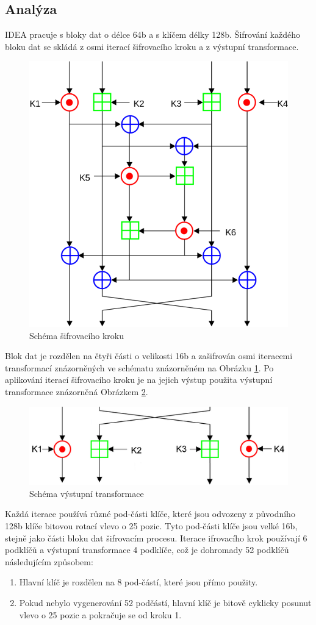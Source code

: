 \documentclass[12pt,a4paper]{article}
\begin{document}
\subsection{Analýza}
IDEA pracuje s bloky dat o délce 64b a s klíčem délky 128b. Šifrování každého bloku dat se skládá z osmi iterací šifrovacího kroku a z výstupní transformace.
\begin{figure}[h]
	\centering
	\includegraphics[width=0.4\linewidth]{img/fig_idea-step.png}
	\caption{Schéma šifrovacího kroku \cite{wiki.IDEA}}
	\label{fig:idea-step}
\end{figure}

Blok dat je rozdělen na čtyři části o velikosti 16b a zašifrován osmi iteracemi transformací znázorněných ve schématu znázorněném na Obrázku \ref{fig:idea-step}. Po aplikování iterací šifrovacího kroku je na jejich výstup použita výstupní transformace znázorněná Obrázkem \ref{fig:idea-half-step}.

\begin{figure}[h]
	\centering
	\includegraphics[width=0.4\linewidth]{img/fig_idea-half-step.png}
	\caption{Schéma výstupní transformace \cite{wiki.IDEA}}
	\label{fig:idea-half-step}
\end{figure}

Každá iterace používá různé pod-části klíče, které jsou odvozeny z původního 128b klíče bitovou rotací vlevo o 25 pozic. Tyto pod-části klíče jsou velké 16b, stejně jako části bloku dat šifrovacím procesu.
Iterace ifrovacího krok používají 6 podklíčů a výstupní transformace 4 podklíče, což je dohromady 52 podklíčů následujícím způsobem:
\begin{enumerate}
\item Hlavní klíč je rozdělen na 8 pod-částí, které jsou přímo použity.
\item Pokud nebylo vygenerování 52 podčástí, hlavní klíč je bitově cyklicky posunut vlevo o 25 pozic a pokračuje se od kroku 1.
\end{enumerate}
\end{document}
